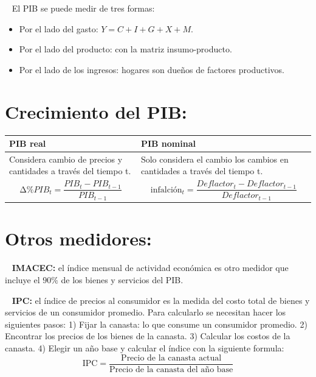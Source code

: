 \documentclass[
  letterpaper,
  DIV=11,
  numbers=noendperiod]{scrreport}
\providecommand{\tightlist}{%
  \setlength{\itemsep}{0pt}\setlength{\parskip}{0pt}}\usepackage{longtable,booktabs,array}
\begin{document}
~ El PIB se puede medir de tres formas:

\begin{itemize}
\tightlist
\item
  Por el lado del gasto: \(Y=C+I+G+X+M\).
\item
  Por el lado del producto: con la matriz insumo-producto.
\item
  Por el lado de los ingresos: hogares son dueños de factores
  productivos.
\end{itemize}

\hypertarget{crecimiento-del-pib}{%
\section{Crecimiento del PIB:}\label{crecimiento-del-pib}}

\begin{table}[h]
    \centering
    \begin{tabular}{|p{55mm}|p{75mm}|}
        \hline
        PIB real & PIB nominal \\ \hline
        Considera cambio de precios y cantidades a través del tiempo t. & Solo considera el cambio los cambios en cantidades a través del tiempo t. \\ \hline
        \[\mathrm{\Delta}\%{PIB}_t=\frac{{PIB}_t-{PIB}_{t-1}}{{PIB}_{t-1}}\] & \[\textrm{infalción}_t=\frac{Deflactor_t-Deflactor_{t-1}}{Deflactor_{t-1}}\]  \\ \hline
    \end{tabular}
    
\end{table}

\hypertarget{otros-medidores}{%
\section{Otros medidores:}\label{otros-medidores}}

~ \textbf{IMACEC:} el índice mensual de actividad económica es otro
medidor que incluye el \(90\%\) de los bienes y servicios del PIB.

~ \textbf{IPC:} el índice de precios al consumidor es la medida del
costo total de bienes y servicios de un consumidor promedio. Para
calcularlo se necesitan hacer los siguientes pasos: 1) Fijar la canasta:
lo que consume un consumidor promedio. 2) Encontrar los precios de los
bienes de la canasta. 3) Calcular los costos de la canasta. 4) Elegir un
año base y calcular el índice con la siguiente formula: \[
\text{IPC}=\frac{\text{Precio de la canasta actual}}{\text{Precio de la canasta del año base}}
\]
\end{document}
